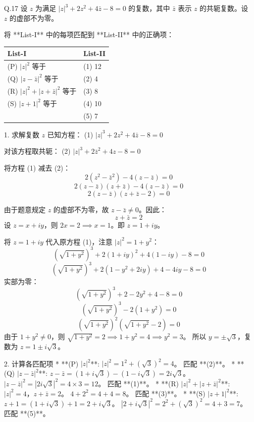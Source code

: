 \begin{questions}
\question
Q.17 设 $z$ 为满足 $|z|^3 + 2z^2 + 4\bar{z} - 8 = 0$ 的复数，其中 $\bar{z}$ 表示 $z$ 的共轭复数。设 $z$ 的虚部不为零。

将 **List-I** 中的每项匹配到 **List-II** 中的正确项：

\begin{table}[H]
\centering
\begin{tabular}{|l|l|}
\hline
\textbf{List-I} & \textbf{List-II} \\ \hline
(P) $|z|^2$ 等于 & (1) 12 \\ \hline
(Q) $|z - \bar{z}|^2$ 等于 & (2) 4 \\ \hline
(R) $|z|^2 + |z + \bar{z}|^2$ 等于 & (3) 8 \\ \hline
(S) $|z + 1|^2$ 等于 & (4) 10 \\ \hline
 & (5) 7 \\ \hline
\end{tabular}
\end{table}

\begin{solution}
1. 求解复数 $z$
已知方程：
(1) $|z|^3 + 2z^2 + 4\bar{z} - 8 = 0$

对该方程取共轭：
(2) $|z|^3 + 2\bar{z}^2 + 4z - 8 = 0$

将方程 (1) 减去 (2)：
\[ 2(z^2 - \bar{z}^2) - 4(z - \bar{z}) = 0 \]
\[ 2(z - \bar{z})(z + \bar{z}) - 4(z - \bar{z}) = 0 \]
\[ 2(z - \bar{z})(z + \bar{z} - 2) = 0 \]

由于题意规定 $z$ 的虚部不为零，故 $z - \bar{z} \neq 0$。因此：
\[ z + \bar{z} = 2 \]
设 $z = x + iy$，则 $2x = 2 \implies x = 1$。即 $z = 1 + iy$。

将 $z = 1 + iy$ 代入原方程 (1)，注意 $|z|^2 = 1 + y^2$：
\[ (\sqrt{1+y^2})^3 + 2(1+iy)^2 + 4(1-iy) - 8 = 0 \]
\[ (\sqrt{1+y^2})^3 + 2(1 - y^2 + 2iy) + 4 - 4iy - 8 = 0 \]
实部为零：
\[ (\sqrt{1+y^2})^3 + 2 - 2y^2 + 4 - 8 = 0 \]
\[ (\sqrt{1+y^2})^3 - 2(1 + y^2) = 0 \]
\[ (\sqrt{1+y^2})^2 (\sqrt{1+y^2} - 2) = 0 \]
由于 $1+y^2 \neq 0$，则 $\sqrt{1+y^2} = 2 \implies 1 + y^2 = 4 \implies y^2 = 3$。
所以 $y = \pm \sqrt{3}$，复数为 $z = 1 \pm i\sqrt{3}$。

2. 计算各匹配项
* **(P) $|z|^2$**:
    $|z|^2 = 1^2 + (\sqrt{3})^2 = 4$。 匹配 **(2)**。
* **(Q) $|z - \bar{z}|^2$**:
    $z - \bar{z} = (1 + i\sqrt{3}) - (1 - i\sqrt{3}) = 2i\sqrt{3}$。
    $|z - \bar{z}|^2 = |2i\sqrt{3}|^2 = 4 \times 3 = 12$。 匹配 **(1)**。
* **(R) $|z|^2 + |z + \bar{z}|^2$**:
    $|z|^2 = 4$，$z + \bar{z} = 2$。
    $4 + 2^2 = 4 + 4 = 8$。 匹配 **(3)**。
* **(S) $|z + 1|^2$**:
    $z + 1 = (1 + i\sqrt{3}) + 1 = 2 + i\sqrt{3}$。
    $|2 + i\sqrt{3}|^2 = 2^2 + (\sqrt{3})^2 = 4 + 3 = 7$。 匹配 **(5)**。


\end{solution}
\end{questions}
